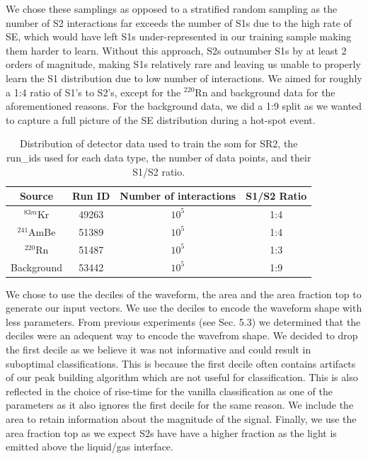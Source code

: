 We chose these samplings as opposed to a stratified random sampling as the number of S2 interactions far exceeds the number of S1s due to the high rate of SE, which would have left S1s under-represented in our training sample making them harder to learn. Without this approach, S2s outnumber S1s by at least 2 orders of magnitude, making S1s relatively rare and leaving us unable to properly learn the S1 distribution due to low number of interactions. We aimed for roughly a 1:4 ratio of S1's to S2's, except for the  $^{220}$Rn and background data for the aforementioned reasons. For the background data, we did a 1:9 split as we wanted to capture a full picture of the SE distribution during a hot-spot event. 


\begin{table}[]
    \centering
    \begin{tabular}{cccc}
    \hline
          Source & Run ID & Number of interactions & S1/S2 Ratio \\
         \hline
         $^{83m}$Kr & 49263 & $10^5$ & 1:4 \\
         $^{241}$AmBe & 51389 & $10^5$ & 1:4 \\
         $^{220}$Rn & 51487 & $10^5$ & 1:3 \\
         Background & 53442 & $10^5$ & 1:9 \\
         \hline
    \end{tabular}
    \caption{Distribution of detector data used to train the \acrshort{som} for SR2, the run\_ids used for each data type, the number of data points, and their S1/S2 ratio.}
    \label{SR2_training_data_distribution}
\end{table}

We chose to use the deciles of the waveform, the area and the area fraction top to generate our input vectors. We use the deciles to encode the waveform shape with less parameters. From previous experiments (see Sec. 5.3) we determined that the deciles were an adequent way to encode the wavefrom shape. We decided to drop the first decile as we believe it was not informative and could result in suboptimal classifications. This is because the first decile often contains artifacts of our peak building algorithm which are not useful for classification. This is also reflected in the choice of rise-time for the vanilla classification as one of the parameters as it also ignores the first decile for the same reason. We include the area to retain information about the magnitude of the signal. Finally, we use the area fraction top as we expect S2s have have a higher fraction as the light is emitted above the liquid/gas interface.

